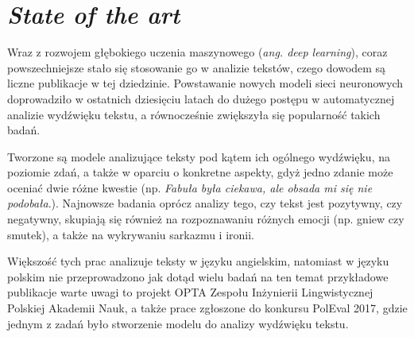 \section{\textit{State of the art}}
\label{sec:stateoftheart}
Wraz z rozwojem głębokiego uczenia maszynowego (\textit{ang. deep learning}), coraz powszechniejsze stało się stosowanie go w analizie tekstów, czego dowodem są liczne publikacje w tej dziedzinie\cite{survey}. Powstawanie nowych modeli sieci neuronowych doprowadziło w ostatnich dziesięciu latach do dużego postępu w automatycznej analizie wydźwięku tekstu\cite{survey}, a równocześnie zwiększyła się popularność takich badań. 

Tworzone są modele analizujące teksty pod kątem ich ogólnego wydźwięku, na poziomie zdań, a także w oparciu o konkretne aspekty, gdyż jedno zdanie może oceniać dwie różne kwestie (np. \textit{Fabuła była ciekawa, ale obsada mi się nie podobała}.). Najnowsze badania oprócz analizy tego, czy tekst jest pozytywny, czy negatywny, skupiają się również na rozpoznawaniu różnych emocji (np. gniew czy smutek), a także na wykrywaniu sarkazmu i ironii\cite{survey}. 

Większość tych prac analizuje teksty w języku angielskim, natomiast w języku polskim nie przeprowadzono jak dotąd wielu badań na ten temat {\textendash} przykładowe publikacje warte uwagi to projekt OPTA\cite{opta} Zespołu Inżynierii Lingwistycznej Polskiej Akademii Nauk, a także prace zgłoszone do konkursu PolEval 2017\cite{poleval}, gdzie jednym z zadań było stworzenie modelu do analizy wydźwięku tekstu.  
